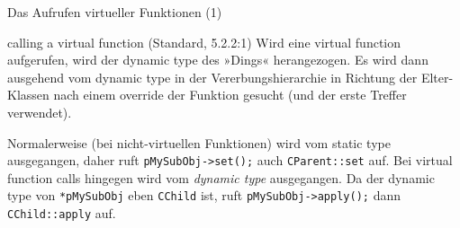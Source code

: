 \begin{frame}[fragile]{Das Aufrufen virtueller Funktionen (1)}
	\begin{block}{calling a virtual function (Standard, 5.2.2:1)}
		Wird eine virtual function aufgerufen, wird der dynamic type des »Dings« herangezogen. Es wird dann ausgehend vom dynamic type in der Vererbungshierarchie in Richtung der Elter-Klassen nach einem override der Funktion gesucht (und der erste Treffer verwendet).
	\end{block}
	
	\pause
	\vspace{1em}
	
	Normalerweise (bei nicht-virtuellen Funktionen) wird vom static type ausgegangen, daher ruft \verb|pMySubObj->set();| auch \verb|CParent::set| auf.
	\vspace{0.5em}
	Bei virtual function calls hingegen wird vom \emph{dynamic type} ausgegangen. Da der dynamic type von \verb|*pMySubObj| eben \verb|CChild| ist, ruft \verb|pMySubObj->apply();| dann \verb|CChild::apply| auf.
\end{frame}

